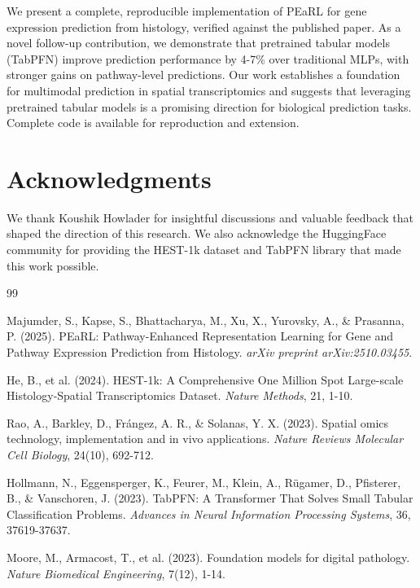 \documentclass[conference]{IEEEtran}
\begin{document}
We present a complete, reproducible implementation of PEaRL for gene expression prediction from histology, verified against the published paper. As a novel follow-up contribution, we demonstrate that pretrained tabular models (TabPFN) improve prediction performance by 4-7\% over traditional MLPs, with stronger gains on pathway-level predictions. Our work establishes a foundation for multimodal prediction in spatial transcriptomics and suggests that leveraging pretrained tabular models is a promising direction for biological prediction tasks. Complete code is available for reproduction and extension.

\section*{Acknowledgments}

We thank Koushik Howlader for insightful discussions and valuable feedback that shaped the direction of this research. We also acknowledge the HuggingFace community for providing the HEST-1k dataset and TabPFN library that made this work possible.

\begin{thebibliography}{99}

Majumder, S., Kapse, S., Bhattacharya, M., Xu, X., Yurovsky, A., \& Prasanna, P. (2025). PEaRL: Pathway-Enhanced Representation Learning for Gene and Pathway Expression Prediction from Histology. \textit{arXiv preprint arXiv:2510.03455}.

He, B., et al. (2024). HEST-1k: A Comprehensive One Million Spot Large-scale Histology-Spatial Transcriptomics Dataset. \textit{Nature Methods}, 21, 1-10.

Rao, A., Barkley, D., Frángez, A. R., \& Solanas, Y. X. (2023). Spatial omics technology, implementation and in vivo applications. \textit{Nature Reviews Molecular Cell Biology}, 24(10), 692-712.

Hollmann, N., Eggensperger, K., Feurer, M., Klein, A., Rügamer, D., Pfisterer, B., \& Vanschoren, J. (2023). TabPFN: A Transformer That Solves Small Tabular Classification Problems. \textit{Advances in Neural Information Processing Systems}, 36, 37619-37637.

Moore, M., Armacost, T., et al. (2023). Foundation models for digital pathology. \textit{Nature Biomedical Engineering}, 7(12), 1-14.

\end{thebibliography}
\end{document}
